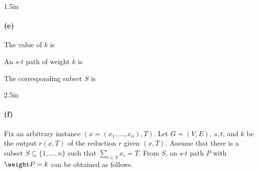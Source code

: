 \begin{answerBox}{1.5in}   %
  
\paragraph{(e)}


The value of $k$ is

An $s$-$t$ path of weight $k$ is 

The corresponding subset $S$ is 

\end{answerBox}


\begin{answerBox}{2.5in}   %

\paragraph{(f)} 


Fix an arbitrary  instance $(x=(x_1,\ldots, x_n), T)$.
Let $G=(V,E)$, $s, t$, and $k$ be the output $r(x, T)$ of the reduction $r$ given $(x, T)$.
Assume that there is a subset $S\subseteq \{1,\ldots,n\}$ such that $\sum_{i\in S} x_i = T$.
From $S$, an $s$-$t$ path $P$ with $\weight P = k$ can be obtained as follows.

\bigskip 

\begin{blue}
  \REPLACEME 
\end{blue}

\end{answerBox}

